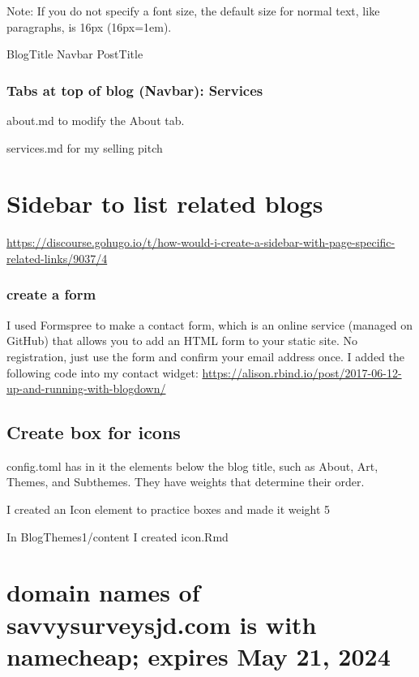 \documentclass[
]{article}
\begin{document}
Note: If you do not specify a font size, the default size for normal
text, like paragraphs, is 16px (16px=1em).

BlogTitle Navbar PostTitle

\hypertarget{tabs-at-top-of-blog-navbar-services}{%
\subsubsection{Tabs at top of blog (Navbar):
Services}\label{tabs-at-top-of-blog-navbar-services}}

about.md to modify the About tab.

services.md for my selling pitch

\hypertarget{sidebar-to-list-related-blogs}{%
\section{Sidebar to list related
blogs}\label{sidebar-to-list-related-blogs}}

\url{https://discourse.gohugo.io/t/how-would-i-create-a-sidebar-with-page-specific-related-links/9037/4}

\hypertarget{create-a-form}{%
\subsubsection{create a form}\label{create-a-form}}

I used Formspree to make a contact form, which is an online service
(managed on GitHub) that allows you to add an HTML form to your static
site. No registration, just use the form and confirm your email address
once. I added the following code into my contact widget:
\url{https://alison.rbind.io/post/2017-06-12-up-and-running-with-blogdown/}

\hypertarget{create-box-for-icons}{%
\subsection{Create box for icons}\label{create-box-for-icons}}

config.toml has in it the elements below the blog title, such as About,
Art, Themes, and Subthemes. They have weights that determine their
order.

I created an Icon element to practice boxes and made it weight 5

In BlogThemes1/content I created icon.Rmd

\hypertarget{domain-names-of-savvysurveysjd.com-is-with-namecheap-expires-may-21-2024}{%
\section{domain names of savvysurveysjd.com is with namecheap; expires
May 21,
2024}\label{domain-names-of-savvysurveysjd.com-is-with-namecheap-expires-may-21-2024}}
\end{document}

